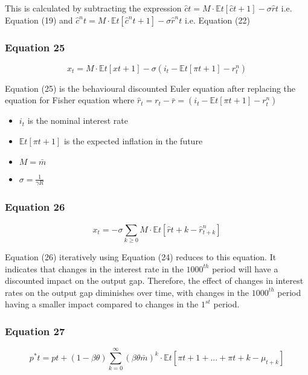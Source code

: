 \documentclass{article}
\begin{document}
This is calculated by subtracting the expression $\hat{c}{t}=M\cdot\mathbb{E}{t}\left[\hat{c}{t+1}\right]-\sigma\hat{r}{t}$ i.e. Equation (19) and $\hat{c}^{n}{t} = M\cdot\mathbb{E}{t}\left[\hat{c}^{n}{t+1}\right]-\sigma\hat{r}^{n}{t}$ i.e. Equation (22)

\subsubsection*{Equation 25}
\begin{equation}
    x_{t}=M\cdot\mathbb{E}{t}\left[x{t+1}\right]-\sigma(i_{t}-\mathbb{E}{t}\left[\pi{t+1}\right]-r^{n}_{t})
\end{equation}

Equation (25) is the behavioural discounted Euler equation after replacing the equation for Fisher equation  where $\hat r_{t}= r_{t}- \bar r = (i_{t}-\mathbb{E}{t}\left[\pi{t+1}\right]-r^{n}_{t})$
\begin{itemize}
    \item $i_{t}$ is the nominal interest rate
    \item $\mathbb{E}{t}\left[\pi{t+1}\right]$ is the expected inflation in the future
    \item $M=\bar{m}$
    \item $\sigma=\frac{1}{\gamma R}$
\end{itemize}

\subsubsection*{Equation 26}
\begin{equation}
    x_{t}=-\sigma\sum_{k\geq 0}{M\cdot \mathbb{E}{t}\left[\hat{r}{t+k}-\hat{r}_{t+k}^{n}\right]}
\end{equation}

Equation (26) iteratively using Equation (24) reduces to this equation. It indicates that changes in the interest rate in the $1000^{th}$ period will have a discounted impact on the output gap. Therefore, the effect of changes in interest rates on the output gap diminishes over time, with changes in the $1000^{th}$ period having a smaller impact compared to changes in the $1^{st}$ period.


 \subsubsection*{Equation 27}
\begin{equation}
    p^{*}{t}=p{t}+(1-\beta\theta)\sum_{k=0}^{\infty}\left(\beta\theta\bar{m}\right)^{k}\cdot\mathbb{E}{t}\left[\pi{t+1}+...+\pi{t+k}-\mu_{t+k}\right]
\end{equation}
\end{document}
